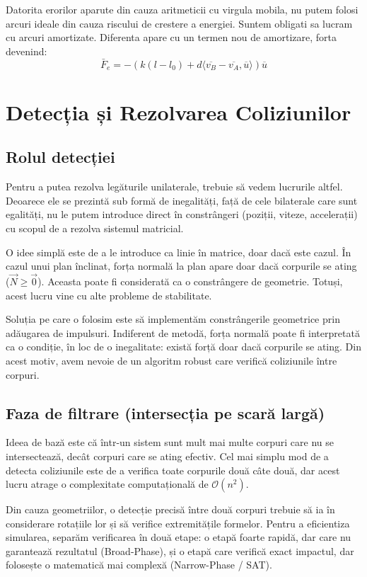 \documentclass[12pt, a4paper]{article}
\begin{document}
Datorita erorilor aparute din cauza aritmeticii cu virgula mobila, nu putem folosi arcuri ideale din cauza riscului de crestere a energiei. Suntem obligati sa lucram cu arcuri amortizate. Diferenta apare cu un termen nou de amortizare, forta devenind:
\begin{equation} 
   \bar{F}_{e} = - ( k (l - l_0)  + d  \langle \overline{v_B} - \overline{v_A}, \overline{u}  \rangle ) \overline{u}
\end{equation}
\newpage

\section{Detecția și Rezolvarea Coliziunilor}

\subsection{Rolul detecției}
Pentru a putea rezolva legăturile unilaterale, trebuie să vedem lucrurile altfel. Deoarece ele se prezintă sub formă de inegalități, față de cele bilaterale care sunt egalități, nu le putem introduce direct în constrângeri (poziții, viteze, accelerații) cu scopul de a rezolva sistemul matricial.

O idee simplă este de a le introduce ca linie în matrice, doar dacă este cazul. În cazul unui plan înclinat, forța normală la plan apare doar dacă corpurile se ating ($\vec{N} \ge \vec{0}$). Aceasta poate fi considerată ca o constrângere de geometrie. Totuși, acest lucru vine cu alte probleme de stabilitate.

Soluția pe care o folosim este să implementăm constrângerile geometrice prin adăugarea de impulsuri. Indiferent de metodă, forța normală poate fi interpretată ca o condiție, în loc de o inegalitate: există forță doar dacă corpurile se ating. Din acest motiv, avem nevoie de un algoritm robust care verifică coliziunile între corpuri.

\subsection{Faza de filtrare (intersecția pe scară largă)}
Ideea de bază este că într-un sistem sunt mult mai multe corpuri care nu se intersectează, decât corpuri care se ating efectiv. Cel mai simplu mod de a detecta coliziunile este de a verifica toate corpurile două câte două, dar acest lucru atrage o complexitate computațională de $\mathcal{O}(n^2)$.

Din cauza geometriilor, o detecție precisă între două corpuri trebuie să ia în considerare rotațiile lor și să verifice extremitățile formelor. Pentru a eficientiza simularea, separăm verificarea în două etape: o etapă foarte rapidă, dar care nu garantează rezultatul (Broad-Phase), și o etapă care verifică exact impactul, dar folosește o matematică mai complexă (Narrow-Phase / SAT).
\end{document}
